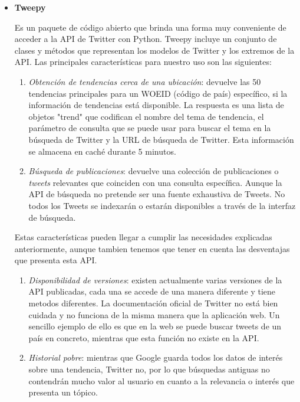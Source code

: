 \begin{itemize}
    \item
    \textbf{Tweepy} \cite{tweepy-manual}
    
    Es un paquete de código abierto que brinda una forma muy conveniente de acceder a la API de Twitter con Python. Tweepy incluye un conjunto de clases y métodos que representan los modelos de Twitter y los extremos de la API. Las principales características para nuestro uso son las siguientes:
    \begin{enumerate}
    \item \textit{Obtención de tendencias cerca de una ubicación}: devuelve las 50 tendencias principales para un WOEID (código de país) específico, si la información de tendencias está disponible. La respuesta es una lista de objetos "trend" que codifican el nombre del tema de tendencia, el parámetro de consulta que se puede usar para buscar el tema en la búsqueda de Twitter y la URL de búsqueda de Twitter. Esta información se almacena en caché durante 5 minutos.
    \item \textit{Búsqueda de publicaciones}: devuelve una colección de publicaciones o \textit{tweets} relevantes que coinciden con una consulta específica. Aunque la API de búsqueda no pretende ser una fuente exhaustiva de Tweets. No todos los Tweets se indexarán o estarán disponibles a través de la interfaz de búsqueda.
    \end{enumerate}

    Estas características pueden llegar a cumplir las necesidades explicadas anteriormente, aunque tambien tenemos que tener en cuenta las desventajas que presenta esta API.

    \begin{enumerate}
    \item \textit{Disponibilidad de versiones}: existen actualmente varias versiones de la API publicadas, cada una se accede de una manera diferente y tiene metodos diferentes. La documentación oficial de Twitter no está bien cuidada y no funciona de la misma manera que la aplicación web. Un sencillo ejemplo de ello es que en la web se puede buscar tweets de un país en concreto, mientras que esta función no existe en la API.
    \item \textit{Historial pobre}: mientras que Google guarda todos los datos de interés sobre una tendencia, Twitter no, por lo que búsquedas antiguas no contendrán mucho valor al usuario en cuanto a la relevancia o interés que presenta un tópico.
    \end{enumerate}

\end{itemize}

